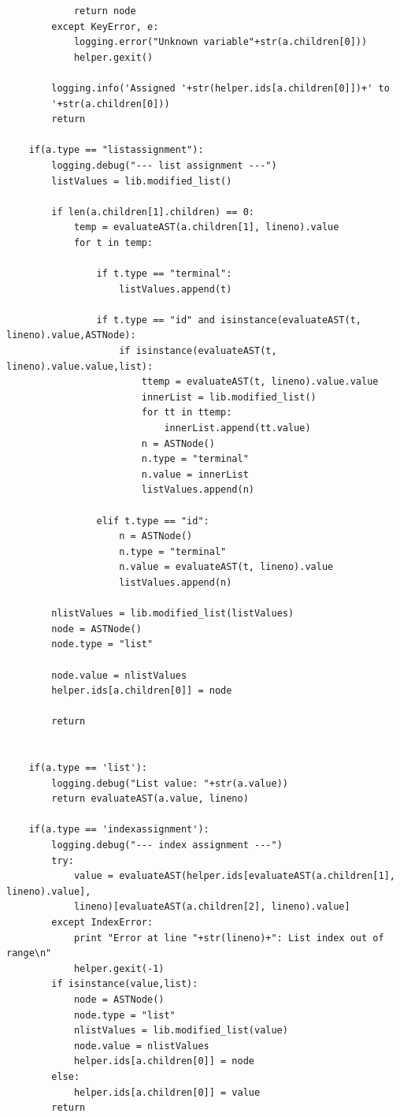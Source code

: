 \documentclass[a4paper]{article}
\begin{document}
\begin{verbatim}
            return node
        except KeyError, e:
            logging.error("Unknown variable"+str(a.children[0]))
            helper.gexit()

        logging.info('Assigned '+str(helper.ids[a.children[0]])+' to 
        '+str(a.children[0]))
        return

    if(a.type == "listassignment"):
        logging.debug("--- list assignment ---")
        listValues = lib.modified_list()

        if len(a.children[1].children) == 0:
            temp = evaluateAST(a.children[1], lineno).value
            for t in temp:

                if t.type == "terminal":
                    listValues.append(t) 

                if t.type == "id" and isinstance(evaluateAST(t, lineno).value,ASTNode):
                    if isinstance(evaluateAST(t, lineno).value.value,list):
                        ttemp = evaluateAST(t, lineno).value.value
                        innerList = lib.modified_list()
                        for tt in ttemp:
                            innerList.append(tt.value)
                        n = ASTNode()
                        n.type = "terminal"
                        n.value = innerList
                        listValues.append(n)

                elif t.type == "id":
                    n = ASTNode()
                    n.type = "terminal"
                    n.value = evaluateAST(t, lineno).value
                    listValues.append(n)

        nlistValues = lib.modified_list(listValues)
        node = ASTNode()
        node.type = "list"

        node.value = nlistValues
        helper.ids[a.children[0]] = node

        return


    if(a.type == 'list'):
        logging.debug("List value: "+str(a.value))
        return evaluateAST(a.value, lineno)

    if(a.type == 'indexassignment'):
        logging.debug("--- index assignment ---")
        try:
            value = evaluateAST(helper.ids[evaluateAST(a.children[1], lineno).value], 
            lineno)[evaluateAST(a.children[2], lineno).value]
        except IndexError:
            print "Error at line "+str(lineno)+": List index out of range\n"
            helper.gexit(-1)
        if isinstance(value,list):
            node = ASTNode()
            node.type = "list"
            nlistValues = lib.modified_list(value)
            node.value = nlistValues
            helper.ids[a.children[0]] = node
        else:
            helper.ids[a.children[0]] = value
        return


\end{verbatim}
\end{document}
